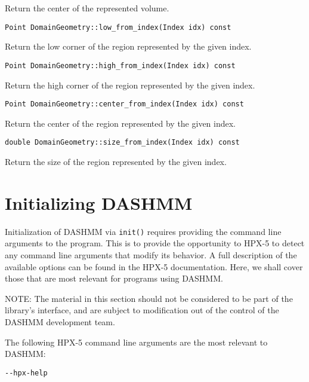 \noindent Return the center of the represented volume.

\begin{lstlisting}
Point DomainGeometry::low_from_index(Index idx) const
\end{lstlisting}

\noindent Return the low corner of the region represented by the given index.

\begin{lstlisting}
Point DomainGeometry::high_from_index(Index idx) const
\end{lstlisting}

\noindent Return the high corner of the region represented by the given index.

\begin{lstlisting}
Point DomainGeometry::center_from_index(Index idx) const
\end{lstlisting}

\noindent Return the center of the region represented by the given index.

\begin{lstlisting}
double DomainGeometry::size_from_index(Index idx) const
\end{lstlisting}

\noindent Return the size of the region represented by the given index.



\section{Initializing DASHMM}

Initialization of DASHMM via \texttt{init()} requires providing the command
line arguments to the program. This is to provide the opportunity to HPX-5 to
detect any command line arguments that modify its behavior. A full description
of the available options can be found in the HPX-5 documentation. Here, we
shall cover those that are most relevant for programs using DASHMM.

NOTE: The material in this section should not be considered to be part of the
library's interface, and are subject to modification out of the control of
the DASHMM development team.

The following HPX-5 command line arguments are the most relevant to DASHMM:

\begin{lstlisting}
--hpx-help
\end{lstlisting}

